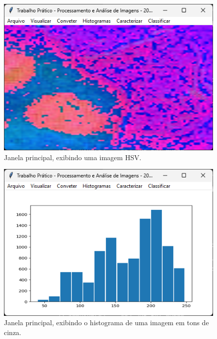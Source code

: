 \documentclass[12pt]{article}
\begin{document}
\begin{figure}
    \centering
    \includegraphics{Captura de tela 2024-06-10 094858.png}
    \caption{Janela principal, exibindo uma imagem HSV.}
    \label{fig:janela-principal-hsv}
\end{figure}

\begin{figure}
    \centering
    \includegraphics{Captura de tela 2024-06-10 094919.png}
    \caption{Janela principal, exibindo o histograma de uma imagem em tons de cinza.}
    \label{fig:janela-principal-histograma-tons-cinza}
\end{figure}
\end{document}
